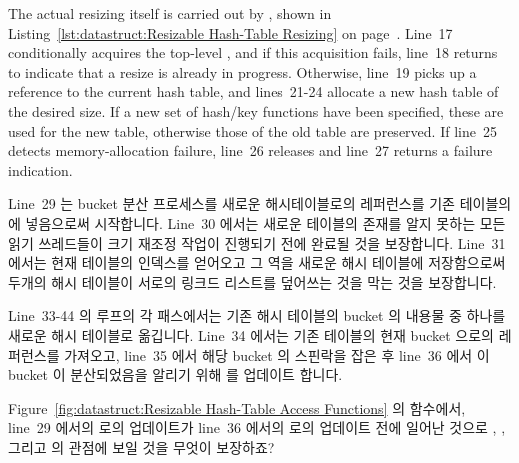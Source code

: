 The actual resizing itself is carried out by , shown in
Listing~\ref{lst:datastruct:Resizable Hash-Table Resizing} on
page~\pageref{lst:datastruct:Resizable Hash-Table Resizing}.
Line~17 conditionally acquires the top-level , and if
this acquisition fails, line~18 returns  to indicate that
a resize is already in progress.
Otherwise, line~19 picks up a reference to the current hash table,
and lines~21-24 allocate a new hash table of the desired size.
If a new set of hash/key functions have been specified, these are
used for the new table, otherwise those of the old table are preserved.
If line~25 detects memory-allocation failure, line~26 releases 
and line~27 returns a failure indication.
\fi

Line~29 는 bucket 분산 프로세스를 새로운 해시테이블로의 레퍼런스를 기존
테이블의  에 넣음으로써 시작합니다.
Line~30 에서는 새로운 테이블의 존재를 알지 못하는 모든 읽기 쓰레드들이 크기
재조정 작업이 진행되기 전에 완료될 것을 보장합니다.
Line~31 에서는 현재 테이블의 인덱스를 얻어오고 그 역을 새로운 해시 테이블에
저장함으로써 두개의 해시 테이블이 서로의 링크드 리스트를 덮어쓰는 것을 막는
것을 보장합니다.

Line~33-44 의 루프의 각 패스에서는 기존 해시 테이블의 bucket 의 내용물 중
하나를 새로운 해시 테이블로 옮깁니다.
Line~34 에서는 기존 테이블의 현재 bucket 으로의 레퍼런스를 가져오고, line~35
에서 해당 bucket 의 스핀락을 잡은 후 line~36 에서 이 bucket 이 분산되었음을
알리기 위해  를 업데이트 합니다.

\QuickQuiz{}
	Figure~\ref{fig:datastruct:Resizable Hash-Table Access Functions} 의
	 함수에서, line~29 에서의  로의
	업데이트가 line~36 에서의  로의 업데이트 전에
	일어난 것으로 , , 그리고
	 의 관점에 보일 것을 무엇이 보장하죠?
	\iffalse

